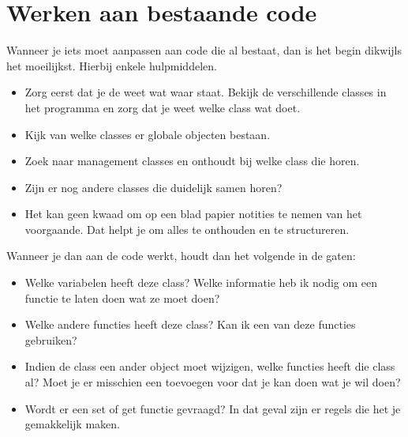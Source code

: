 \section{Werken aan bestaande code}
Wanneer je iets moet aanpassen aan code die al bestaat, dan is het begin dikwijls het moeilijkst. Hierbij enkele hulpmiddelen.

\begin{itemize}
\item Zorg eerst dat je de weet wat waar staat. Bekijk de verschillende classes in het programma en zorg dat je weet welke class wat doet.
\item Kijk van welke classes er globale objecten bestaan.
\item Zoek naar management classes en onthoudt bij welke class die horen.
\item Zijn er nog andere classes die duidelijk samen horen?
\item Het kan geen kwaad om op een blad papier notities te nemen van het voorgaande. Dat helpt je om alles te onthouden en te structureren.
\end{itemize}

Wanneer je dan aan de code werkt, houdt dan het volgende in de gaten:
\begin{itemize}
\item Welke variabelen heeft deze class? Welke informatie heb ik nodig om een functie te laten doen wat ze moet doen?
\item Welke andere functies heeft deze class? Kan ik een van deze functies gebruiken?
\item Indien de class een ander object moet wijzigen, welke functies heeft die class al? Moet je er misschien een toevoegen voor dat je kan doen wat je wil doen?
\item Wordt er een set of get functie gevraagd? In dat geval zijn er regels die het je gemakkelijk maken.
\end{itemize}







